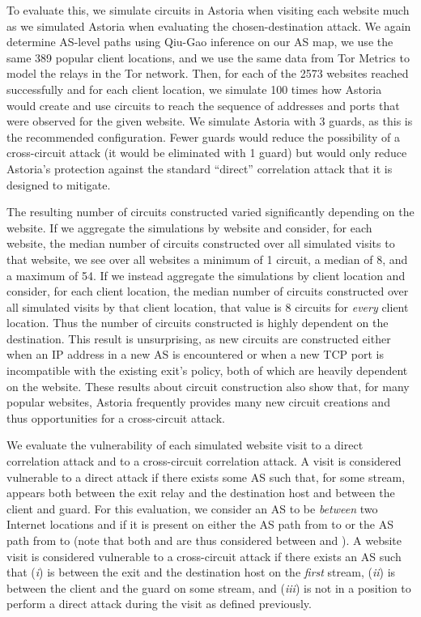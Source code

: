 \documentclass[conference]{styles/IEEEtran}
\begin{document}
To evaluate this, we simulate circuits in Astoria when visiting each website much
as we simulated Astoria when evaluating the chosen-destination attack. We again determine AS-level
paths using Qiu-Gao inference on our AS map, we use the same 389 popular client locations, and we
use the same data from Tor Metrics to model the relays in the Tor network. Then,
for each of the 2573 websites reached successfully and for each client location, we simulate
100 times how Astoria would create and use circuits to reach the sequence of addresses and ports
that were observed for the given website. We simulate Astoria with 3 guards, as this is the
recommended configuration. Fewer guards would reduce the possibility of a cross-circuit attack
(it would be eliminated with 1 guard) but would only reduce Astoria's protection against the
standard ``direct'' correlation attack that it is designed to mitigate.

The resulting number of circuits constructed varied significantly depending on the website.
If we aggregate the simulations by website and consider, for each
website, the median number of circuits constructed over all simulated visits to that website, we see
over all websites a minimum of 1 circuit, a median of 8, and a maximum of 54. If we instead
aggregate the simulations by client location and consider, for each client location, the median
number of circuits
constructed over all simulated visits by that client location, that value is 8 circuits for
\emph{every} client location. Thus the number of circuits constructed is highly dependent on the
destination. This result is unsurprising, as new circuits are constructed either when an IP address
in a new AS is encountered or when a new TCP port is incompatible with the existing exit's policy,
both of which are heavily dependent on the website. These results about circuit construction also
show that, for many popular websites, Astoria frequently provides many new circuit creations and
thus opportunities for a cross-circuit attack.

We evaluate the vulnerability of each simulated website visit to a direct correlation attack and to
a cross-circuit correlation attack. A visit is considered vulnerable to a direct attack
if there exists some AS  such that, for some stream,  appears both between the exit relay and
the destination host and between the client and guard. For this evaluation, we consider an AS to be
\emph{between} two Internet locations  and  if it is present on either the AS path from  to
 or the AS path from  to  (note that both  and  are thus considered between  and
). A website visit is considered vulnerable to a cross-circuit attack if there exists an AS 
such that (\emph{i})  is between the exit and the destination host on the \emph{first} stream,
(\emph{ii})  is between the client and the guard on some stream, and (\emph{iii})  is not
in a position to perform a direct attack during the visit as defined previously.
\end{document}
